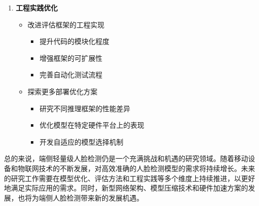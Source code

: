 \documentclass{article}
\begin{document}
\begin{enumerate}
    \item \textbf{工程实践优化}
    \begin{itemize}
        \item 改进评估框架的工程实现
        \begin{itemize}
            \item 提升代码的模块化程度
            \item 增强框架的可扩展性
            \item 完善自动化测试流程
        \end{itemize}
        \item 探索更多部署优化方案
        \begin{itemize}
            \item 研究不同推理框架的性能差异
            \item 优化模型在特定硬件平台上的表现
            \item 开发自适应的模型选择机制
        \end{itemize}
    \end{itemize}
\end{enumerate}

总的来说，端侧轻量级人脸检测仍是一个充满挑战和机遇的研究领域。随着移动设备和物联网技术的不断发展，对高效准确的人脸检测模型的需求将持续增长。未来的研究工作需要在模型优化、评估方法和工程实践等多个维度上持续推进，以更好地满足实际应用的需求。同时，新型网络架构、模型压缩技术和硬件加速方案的发展，也将为端侧人脸检测带来新的发展机遇。

\clearpage



\end{document}
